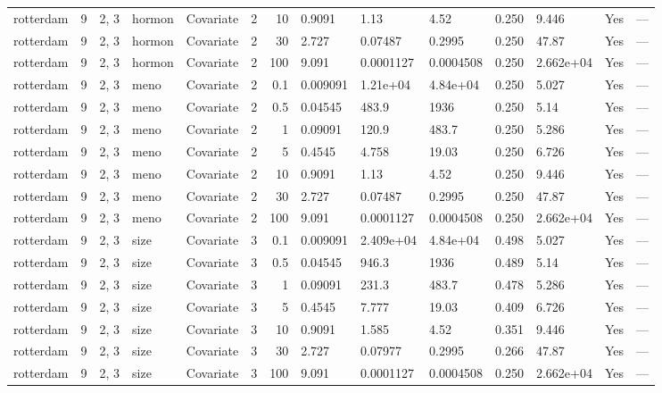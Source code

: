 \begin{tabular}{lrlllrrlllllll}
  rotterdam & 9 & 2, 3 & hormon & Covariate & 2 &    10 & 0.9091 & 1.13 & 4.52 & 0.250 & 9.446 & Yes & --- \\ 
  rotterdam & 9 & 2, 3 & hormon & Covariate & 2 &    30 & 2.727 & 0.07487 & 0.2995 & 0.250 & 47.87 & Yes & --- \\ 
  rotterdam & 9 & 2, 3 & hormon & Covariate & 2 &   100 & 9.091 & 0.0001127 & 0.0004508 & 0.250 & 2.662e+04 & Yes & --- \\ 
  rotterdam & 9 & 2, 3 & meno & Covariate & 2 &   0.1 & 0.009091 & 1.21e+04 & 4.84e+04 & 0.250 & 5.027 & Yes & --- \\ 
  rotterdam & 9 & 2, 3 & meno & Covariate & 2 &   0.5 & 0.04545 & 483.9 & 1936 & 0.250 & 5.14 & Yes & --- \\ 
  rotterdam & 9 & 2, 3 & meno & Covariate & 2 &     1 & 0.09091 & 120.9 & 483.7 & 0.250 & 5.286 & Yes & --- \\ 
  rotterdam & 9 & 2, 3 & meno & Covariate & 2 &     5 & 0.4545 & 4.758 & 19.03 & 0.250 & 6.726 & Yes & --- \\ 
  rotterdam & 9 & 2, 3 & meno & Covariate & 2 &    10 & 0.9091 & 1.13 & 4.52 & 0.250 & 9.446 & Yes & --- \\ 
  rotterdam & 9 & 2, 3 & meno & Covariate & 2 &    30 & 2.727 & 0.07487 & 0.2995 & 0.250 & 47.87 & Yes & --- \\ 
  rotterdam & 9 & 2, 3 & meno & Covariate & 2 &   100 & 9.091 & 0.0001127 & 0.0004508 & 0.250 & 2.662e+04 & Yes & --- \\ 
  rotterdam & 9 & 2, 3 & size & Covariate & 3 &   0.1 & 0.009091 & 2.409e+04 & 4.84e+04 & 0.498 & 5.027 & Yes & --- \\ 
  rotterdam & 9 & 2, 3 & size & Covariate & 3 &   0.5 & 0.04545 & 946.3 & 1936 & 0.489 & 5.14 & Yes & --- \\ 
  rotterdam & 9 & 2, 3 & size & Covariate & 3 &     1 & 0.09091 & 231.3 & 483.7 & 0.478 & 5.286 & Yes & --- \\ 
  rotterdam & 9 & 2, 3 & size & Covariate & 3 &     5 & 0.4545 & 7.777 & 19.03 & 0.409 & 6.726 & Yes & --- \\ 
  rotterdam & 9 & 2, 3 & size & Covariate & 3 &    10 & 0.9091 & 1.585 & 4.52 & 0.351 & 9.446 & Yes & --- \\ 
  rotterdam & 9 & 2, 3 & size & Covariate & 3 &    30 & 2.727 & 0.07977 & 0.2995 & 0.266 & 47.87 & Yes & --- \\ 
  rotterdam & 9 & 2, 3 & size & Covariate & 3 &   100 & 9.091 & 0.0001127 & 0.0004508 & 0.250 & 2.662e+04 & Yes & --- \\ 

\end{tabular}
